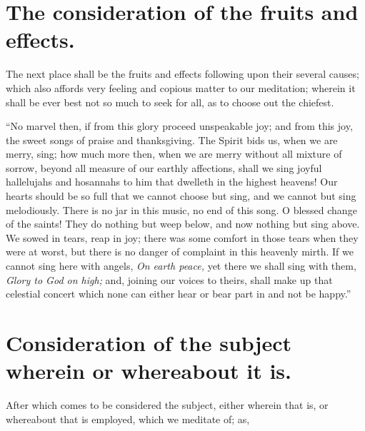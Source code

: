 \section{The consideration of the fruits and effects.}

The next place shall be the fruits and effects following upon their several causes; which also affords very feeling and copious matter to our meditation; wherein it shall be ever best not so much to seek for all, as to choose out the chiefest. 

``No marvel then, if from this glory proceed unspeakable joy; and from this joy, the sweet songs of praise and thanksgiving. The Spirit bids us, when we are merry, sing; how much more then, when we are merry without all mixture of sorrow, beyond all measure of our earthly affections, shall we sing joyful hallelujahs and hosannahs to him that dwelleth in the highest heavens! Our hearts should be so full that we cannot choose but sing, and we cannot but sing melodiously. There is no jar in this music, no end of this song. O blessed change of the saints! They do nothing but weep below, and now nothing but sing above. We sowed in tears, reap in joy; there was some comfort in those tears when they were at worst, but there is no danger of complaint in this heavenly mirth. If we cannot sing here with angels, \emph{On earth peace,} yet there we shall sing with them, \emph{Glory to God on high;} and, joining our voices to theirs, shall make up that celestial concert which none can either hear or bear part in and not be happy.''

\section{Consideration of the subject wherein or whereabout it is.}

After which comes to be considered the subject, either wherein that is, or whereabout that is employed, which we meditate of; as, 

